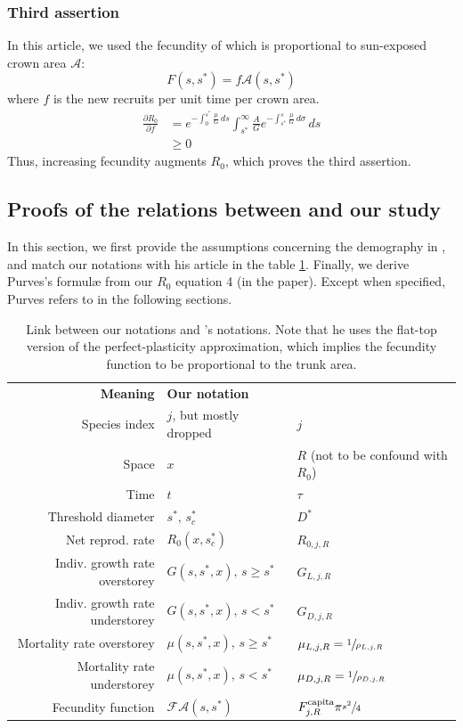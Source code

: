 \documentclass[letterpaper, 12pt]{article}
\newcommand {\s}{{s}^{*}}
\newcommand {\A}{\mathscr{A}}
\newcommand{\F}{\mathcal{F}}
\theoremstyle{theo}
\begin{document}
\begin{refsection}
\begin{onehalfspace}
\subsubsection{Third assertion}
In this article, we used the fecundity of \citet{Purves2008} which is proportional to sun-exposed crown area $ \A $:
\[
	F(s, \s) = f \A(s, \s)
\]
where $ f $ is the new recruits per unit time per crown area.
\begin{align*}
	\frac{\partial R_0}{\partial f} &= e^{-\int_0^{\s} \frac{\mu}{G} \, ds} \int_{\s}^{\infty} \frac{A}{G} e^{-\int_{\s}^{s} \frac{\mu}{G} \, d \sigma} \, ds \\
		&\geqslant 0
\end{align*}
Thus, increasing fecundity augments $ R_0 $, which proves the third assertion.

\subsection{Proofs of the relations between \citet{Purves2009} and our study}
In this section, we first provide the assumptions concerning the demography in \citet{Purves2009}, and match our notations with his article in the table \ref{tab::notations_purves2009}. Finally, we derive Purves's formul\ae{} from our $ R_0 $ equation 4 (in the paper). Except when specified, Purves refers to \citet{Purves2009} in the following sections.
\begin{table}[!h]
	\centering
	\caption{Link between our notations and \citet{Purves2009}'s notations. Note that he uses the flat-top version of the perfect-plasticity approximation, which implies the fecundity function to be proportional to the trunk area.}
	\label{tab::notations_purves2009}
	\begin{tabular}{@{}rll@{}}
	\toprule
	\textbf{Meaning} & \textbf{Our notation} & \textbf{\citet{Purves2009}} \\
	Species index & $ j $, but mostly dropped & $ j $ \\
	Space & $ x $ & $ R $ (not to be confound with $ R_0 $) \\
	Time & $ t $ & $ \tau $ \\
	Threshold diameter & $ \s, \, \s_c $ & $ D^{*} $ \\
	Net reprod. rate & $ R_0 (x, \s_c) $ & $ R_{0, j, R} $ \\
	Indiv. growth rate overstorey & $ G(s, \s, x), \, s \geqslant \s $ & $ G_{L, j, R} $ \\
	Indiv. growth rate understorey & $ G(s, \s, x), \, s < \s $ & $ G_{D, j, R} $ \\
	Mortality rate overstorey & $ \mu(s, \s, x), \, s \geqslant \s $ & $ \mu_{L, j, R} = \sfrac{1}{\rho_{L, j, R}} $ \\
	Mortality rate understorey & $ \mu(s, \s, x), \, s < \s $ & $ \mu_{D, j, R} = \sfrac{1}{\rho_{D, j, R}} $ \\
	Fecundity function & $ \F \A(s, \s) $ & $ F_{j, R}^{\text{capita}} \pi \sfrac{s^2}{4} $ \\
   \bottomrule
	\end{tabular}
\end{table}


\end{onehalfspace}
\end{refsection}
\end{document}
